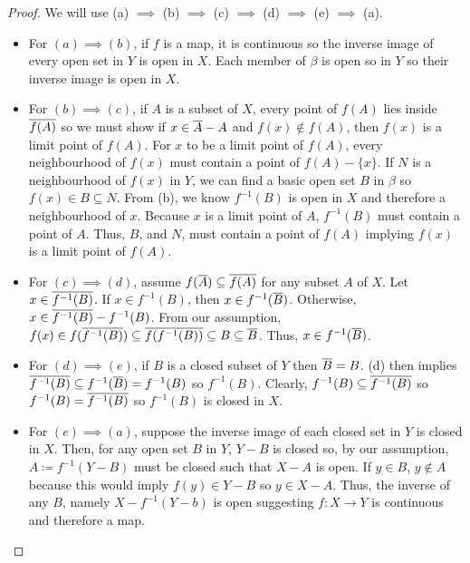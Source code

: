 \begin{proof}
    We will use (a) $\implies$ (b) $\implies$ (c) $\implies$ (d) $\implies$ (e) $\implies$ (a).
    \begin{itemize}
        \item For $(a) \implies (b)$, if $f$ is a map, it is continuous so the inverse image of every open set in $Y$ is open in $X$. Each member of $\beta$ is open so in $Y$ so their inverse image is open in $X$. 
        \item For $(b) \implies (c)$, if $A$ is a subset of $X$, every point of $f(A)$ lies inside $\overline{f(A)}$ so we must show if $x \in \overline{A} - A$ and $f(x) \notin f(A)$, then $f(x)$ is a limit point of $f(A)$. For $x$ to be a limit point of $f(A)$, every neighbourhood of $f(x)$ must contain a point of $f(A) - \{x\}$. If $N$ is a neighbourhood of $f(x)$ in $Y$, we can find a basic open set $B$ in $\beta$ so $f(x) \in B \subseteq N$. From (b), we know $f^{-1}(B)$ is open in $X$ and therefore a neighbourhood of $x$. Because $x$ is a limit point of $A$, $f^{-1}(B)$ must contain a point of $A$. Thus, $B$, and $N$, must contain a point of $f(A)$ implying $f(x)$ is a limit point of $f(A)$.
        \item For $(c) \implies (d)$, assume $f(\overline{A}) \subseteq \overline{f(A)}$ for any subset $A$ of $X$. Let $x \in \overline{f^{-1}(B)}$. If $x \in f^{-1}(B)$, then $x \in f^{-1}(\overline{B})$. Otherwise, $x \in \overline{f^{-1}(B)} - f^{-1}(B)$. From our assumption, $f(x) \in f(\overline{f^{-1}(B)}) \subseteq \overline{f(f^{-1}(B))} \subseteq B \subseteq \overline{B}$. Thus, $x \in f^{-1}(\overline{B})$.
        \item For $(d) \implies (e)$, if $B$ is a closed subset of $Y$ then $\overline{B} = B$. (d) then implies $\overline{f^{-1}(B)} \subseteq f^{-1}(\overline{B}) = f^{-1}(B)$ so $f^{-1}(B)$. Clearly, $f^{-1}(B) \subseteq \overline{f^{-1}(B)}$ so $f^{-1}(B) = \overline{f^{-1}(B)}$ so $f^{-1}(B)$ is closed in $X$.
        \item For $(e) \implies (a)$, suppose the inverse image of each closed set in $Y$ is closed in $X$. Then, for any open set $B$ in $Y$, $Y-B$ is closed so, by our assumption, $A\coloneq f^{-1}(Y-B)$ must be closed such that $X-A$ is open. If $y \in B$, $y \notin A$ because this would imply $f(y) \in Y-B$ so $y \in X-A$. Thus, the inverse of any $B$, namely $X - f^{-1}(Y-b)$ is open suggesting $f\colon X\to Y$ is continuous and therefore a map.
    \end{itemize}
\end{proof}
